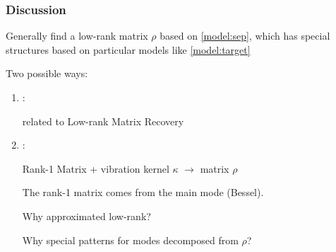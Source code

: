 \documentclass[UTF8]{beamer}
\begin{document}
\begin{frame} \frametitle{Discussion}

Generally find a low-rank matrix $\rho$ based on \eqref{model:sep}, which has
special structures based on particular models like \eqref{model:target}

Two possible ways:

\begin{enumerate}

\item {}:  

related to Low-rank Matrix Recovery

\item {}:

Rank-1 Matrix + vibration kernel $\kappa$ $\rightarrow$ matrix $\rho$

The rank-1 matrix comes from the main mode (Bessel).

Why approximated low-rank?

Why special patterns for modes decomposed from $\rho$? 
\end{enumerate}





\end{frame}
\end{document}
